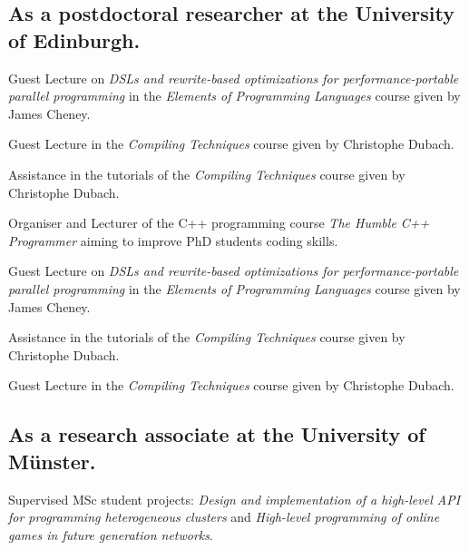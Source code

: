 \subsection{As a postdoctoral researcher at the University of Edinburgh.}

\begin{cvitemize}[2016 - 2017]
    \item Guest Lecture on \emph{\small DSLs and rewrite-based optimizations for performance-portable parallel programming} in the \emph{Elements of Programming Languages} course given by James Cheney.
    \item Guest Lecture in the \emph{Compiling Techniques} course given by Christophe Dubach.
    \item Assistance in the tutorials of the \emph{Compiling Techniques} course given by Christophe Dubach.
\end{cvitemize}

\begin{cvitemize}[2015 - 2016]
    \item Organiser and Lecturer of the C++ programming course \emph{The Humble C++ Programmer} aiming to improve PhD students coding skills.
    \item Guest Lecture on \emph{\small DSLs and rewrite-based optimizations for performance-portable parallel programming} in the \emph{Elements of Programming Languages} course given by James Cheney.
    \item Assistance in the tutorials of the \emph{Compiling Techniques} course given by Christophe Dubach.
\end{cvitemize}

\begin{cvitemize}[\small 2014 - 2015]
    \item Guest Lecture in the \emph{Compiling Techniques} course given by Christophe Dubach.
\end{cvitemize}

\subsection{As a research associate at the University of Münster.}

\begin{cvitemize}[2013 - 2014]
  \item Supervised MSc student projects:
        \emph{Design and implementation of a high-level API for programming heterogeneous clusters} and \emph{High-level programming of online games in future generation networks}.
\end{cvitemize}

